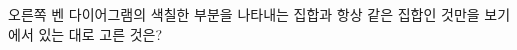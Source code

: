 \noindent\begin{minipage}[t]{0.58\linewidth}\vspace{0pt}\raggedright 오른쪽 벤 다이어그램의 색칠한 부분을 나타내는 집합과 항상 같은 집합인 것만을 보기에서 있는 대로 고른 것은?\end{minipage}\hfill\begin{minipage}[t]{0.4\linewidth}\vspace{0pt}\centering \resizebox{\ifdim\width>\linewidth\linewidth\else\width\fi}{!}{}\end{minipage}\par
\noindent {}
